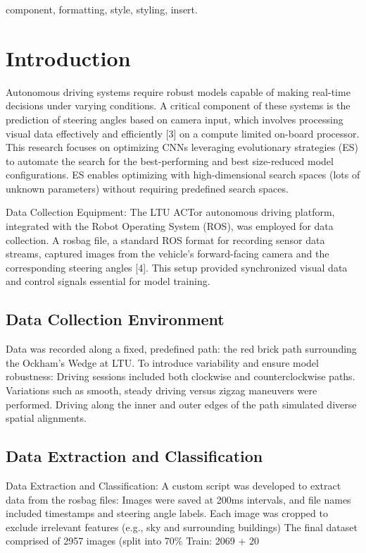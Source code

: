 \documentclass[conference]{IEEEtran}
\begin{document}
\begin{IEEEkeywords}
component, formatting, style, styling, insert.
\end{IEEEkeywords}

\section{Introduction}
Autonomous driving systems require robust models capable of making real-time decisions under varying conditions. A critical component of these systems is the prediction of steering angles based on camera input, which involves processing visual data effectively and efficiently [3] on a compute limited on-board processor. This research focuses on optimizing CNNs leveraging evolutionary strategies (ES) to automate the search for the best-performing and best size-reduced model configurations. ES enables optimizing with high-dimensional search spaces (lots of unknown parameters) without requiring predefined search spaces.

Data Collection Equipment: The LTU ACTor autonomous driving platform, integrated with the Robot Operating System (ROS), was employed for data collection. A rosbag file, a standard ROS format for recording sensor data streams, captured images from the vehicle’s forward-facing camera and the corresponding steering angles [4]. This setup provided synchronized visual data and control signals essential for model training.


\subsection{Data Collection Environment}
Data was recorded along a fixed, predefined path: the red brick path surrounding the Ockham’s Wedge at LTU. To introduce variability and ensure model robustness:
Driving sessions included both clockwise and counterclockwise paths.
Variations such as smooth, steady driving versus zigzag maneuvers were performed.
Driving along the inner and outer edges of the path simulated diverse spatial alignments.

\subsection{Data Extraction and Classification}
Data Extraction and Classification: A custom script was developed to extract data from the rosbag files:
Images were saved at 200ms intervals, and file names included timestamps and steering angle labels.
Each image was cropped to exclude irrelevant features (e.g., sky and surrounding buildings)
The final dataset comprised of 2957 images (split into 70\% Train: 2069 + 20%
\end{document}
